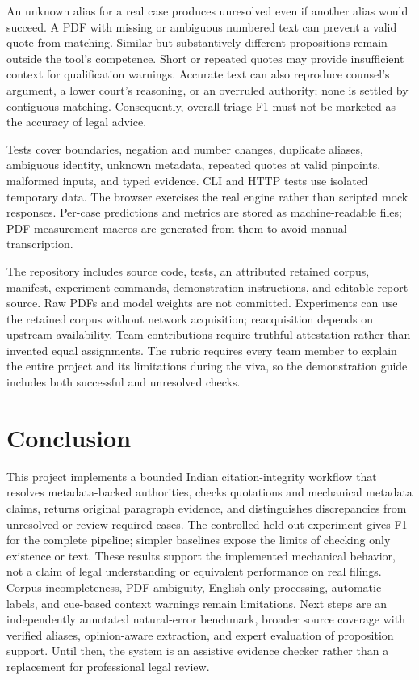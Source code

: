 \documentclass[conference]{IEEEtran}
\begin{document}
An unknown alias for a real case produces unresolved even if another alias would succeed. A PDF with missing or ambiguous numbered text can prevent a valid quote from matching. Similar but substantively different propositions remain outside the tool's competence. Short or repeated quotes may provide insufficient context for qualification warnings. Accurate text can also reproduce counsel's argument, a lower court's reasoning, or an overruled authority; none is settled by contiguous matching. Consequently, overall triage F1 must not be marketed as the accuracy of legal advice.

Tests cover boundaries, negation and number changes, duplicate aliases, ambiguous identity, unknown metadata, repeated quotes at valid pinpoints, malformed inputs, and typed evidence. CLI and HTTP tests use isolated temporary data. The browser exercises the real engine rather than scripted mock responses. Per-case predictions and metrics are stored as machine-readable files; PDF measurement macros are generated from them to avoid manual transcription.

The repository includes source code, tests, an attributed retained corpus, manifest, experiment commands, demonstration instructions, and editable report source. Raw PDFs and model weights are not committed. Experiments can use the retained corpus without network acquisition; reacquisition depends on upstream availability. Team contributions require truthful attestation rather than invented equal assignments. The rubric requires every team member to explain the entire project and its limitations during the viva, so the demonstration guide includes both successful and unresolved checks.

\section{Conclusion}
This project implements a bounded Indian citation-integrity workflow that resolves metadata-backed authorities, checks quotations and mechanical metadata claims, returns original paragraph evidence, and distinguishes discrepancies from unresolved or review-required cases. The controlled held-out experiment gives \FullFone{} F1 for the complete pipeline; simpler baselines expose the limits of checking only existence or text. These results support the implemented mechanical behavior, not a claim of legal understanding or equivalent performance on real filings. Corpus incompleteness, PDF ambiguity, English-only processing, automatic labels, and cue-based context warnings remain limitations. Next steps are an independently annotated natural-error benchmark, broader source coverage with verified aliases, opinion-aware extraction, and expert evaluation of proposition support. Until then, the system is an assistive evidence checker rather than a replacement for professional legal review.


\end{document}
